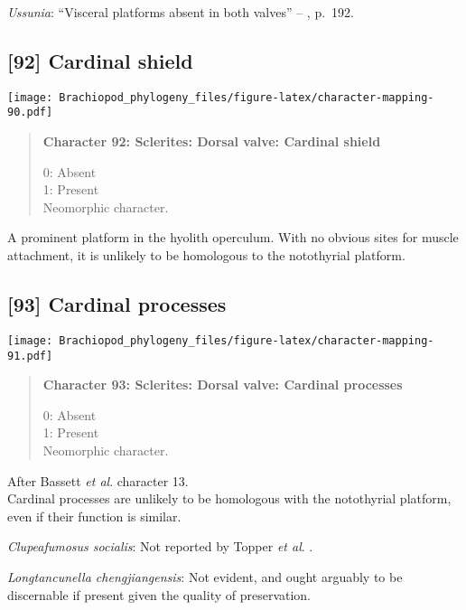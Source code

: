 \documentclass[openany]{book}
\theoremstyle{definition}
\theoremstyle{definition}
\theoremstyle{definition}
\theoremstyle{remark}
\begin{document}
\hypertarget{Ussunia-coding-91}{}
\emph{Ussunia}: ``Visceral platforms absent in both valves'' --
\citet{Williams2000LinguliformeaCraniiformea}, p.~192.

\subsection*{{[}92{]} Cardinal shield}\label{cardinal-shield}

\texttt{[image: Brachiopod\_phylogeny\_files/figure-latex/character-mapping-90.pdf]}

\begin{quote}
\textbf{Character 92: Sclerites: Dorsal valve: Cardinal shield}

0: Absent\\
1: Present\\
Neomorphic character.
\end{quote}

A prominent platform in the hyolith operculum. With no obvious sites for
muscle attachment, it is unlikely to be homologous to the notothyrial
platform.

\subsection*{{[}93{]} Cardinal processes}\label{cardinal-processes}

\texttt{[image: Brachiopod\_phylogeny\_files/figure-latex/character-mapping-91.pdf]}

\begin{quote}
\textbf{Character 93: Sclerites: Dorsal valve: Cardinal processes}

0: Absent\\
1: Present\\
Neomorphic character.
\end{quote}

After Bassett \emph{et al}.
\citeyearpar{Bassett2001Functionalmorphology} character 13.\\
Cardinal processes are unlikely to be homologous with the notothyrial
platform, even if their function is similar.

\hypertarget{Clupeafumosus_socialis-coding-93}{}
\emph{Clupeafumosus socialis}: Not reported by Topper \emph{et al}.
\citeyearpar{Topper2013Reappraisalof}.

\hypertarget{Longtancunella_chengjiangensis-coding-93}{}
\emph{Longtancunella chengjiangensis}: Not evident, and ought arguably
to be discernable if present given the quality of preservation.
\end{document}
